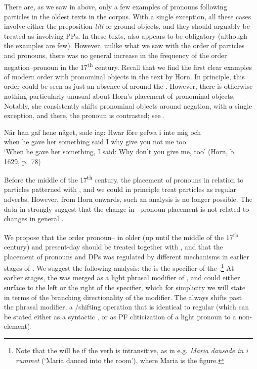 \documentclass[output=paper]{langscibook}
\begin{document}
There are, as we saw in  above, only a few examples of pronouns following particles in the oldest texts in the corpus. With a single exception, all these cases involve either the preposition \textit{till} or ground objects, and they should arguably be treated as involving PPs. In these texts,  also appears to be obligatory (although the examples are few). However, unlike what we saw with the order of particles and pronouns, there was no general increase in the frequency of the order negation–pronoun in the 17\textsuperscript{th} century. Recall that we find the first clear examples of modern  order with pronominal objects in the text by Horn. In principle, this order could be seen as just an absence of  around the . However, there is otherwise nothing particularly unusual about Horn’s placement of pronominal objects. Notably, she consistently shifts pronominal objects around negation, with a single exception, and there, the pronoun is contrasted; see .\largerpage


\ea\label{ex:lalu:52}
\gll  När       han  gaf   hene   någet,       sade   iag:   {Hwar före} gefwa   i     inte   mig   och\\
when    he   gave   her   something   said   I       why   give     you   not   me   too\\
\glt `When he gave her something, I said: Why don’t you give me, too’ (Horn, b. 1629, p.~78)\\
\z


Before the middle of the 17\textsuperscript{th} century, the placement of pronouns in relation to particles patterned with , and we could in principle treat particles as regular adverbs. However, from Horn onwards, such an analysis is no longer possible. The data in  strongly suggest that the change in –pronoun placement is not related to changes in general .



We propose that the order pronoun– in older  (up until the middle of the 17\textsuperscript{th} century) and present-day  should be treated together with , and that the placement of pronouns and DPs was regulated by different mechanisms in earlier stages of . We suggest the following analysis: the  is the specifier of the .\footnote{Note that the  will be  if the verb is intransitive, as in e.g. \textit{Maria dansade in i rummet} (‘Maria danced into the room’), where Maria is the figure.} At earlier stages, the  was merged as a light phrasal modifier of , and could either surface to the left or the right of the specifier, which for simplicity we will state in terms of the branching directionality of the modifier. The  always shifts past the phrasal modifier, a /shifting operation that is identical to regular  (which can be stated either as a syntactic , or as PF cliticization of a light pronoun to a non- element). 
\end{document}
